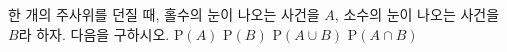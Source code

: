 한 개의 주사위를 던질 때, 홀수의 눈이 나오는 사건을 $A$, 소수의 눈이 나오는 사건을 $B$라 하자. 다음을 구하시오.
 $\mathrm{P}(A)$
 $\mathrm{P}(B)$
 $\mathrm{P}(A\cup B)$
 $\mathrm{P}(A\cap B)$
